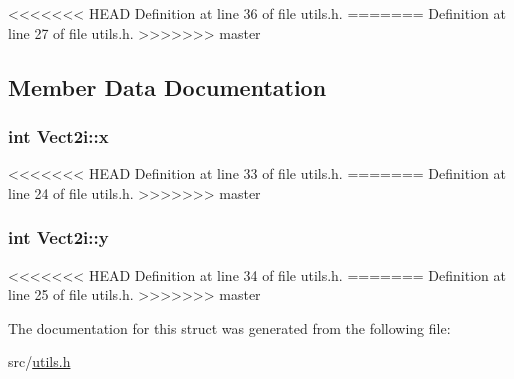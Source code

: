 <<<<<<< HEAD
Definition at line 36 of file utils.\-h.
=======
Definition at line 27 of file utils.\-h.
>>>>>>> master



\subsection{Member Data Documentation}
\hypertarget{struct_vect2i_ae76ced0cba575b16f9de72e78828122b}{
\subsubsection[{x}]{\setlength{\rightskip}{0pt plus 5cm}int Vect2i\-::x}}\label{struct_vect2i_ae76ced0cba575b16f9de72e78828122b}


<<<<<<< HEAD
Definition at line 33 of file utils.\-h.
=======
Definition at line 24 of file utils.\-h.
>>>>>>> master

\hypertarget{struct_vect2i_a32d99812cd2cccca2b9751259783b699}{
\subsubsection[{y}]{\setlength{\rightskip}{0pt plus 5cm}int Vect2i\-::y}}\label{struct_vect2i_a32d99812cd2cccca2b9751259783b699}


<<<<<<< HEAD
Definition at line 34 of file utils.\-h.
=======
Definition at line 25 of file utils.\-h.
>>>>>>> master



The documentation for this struct was generated from the following file\-:\begin{DoxyCompactItemize}
\item 
src/\hyperlink{utils_8h}{utils.\-h}\end{DoxyCompactItemize}
